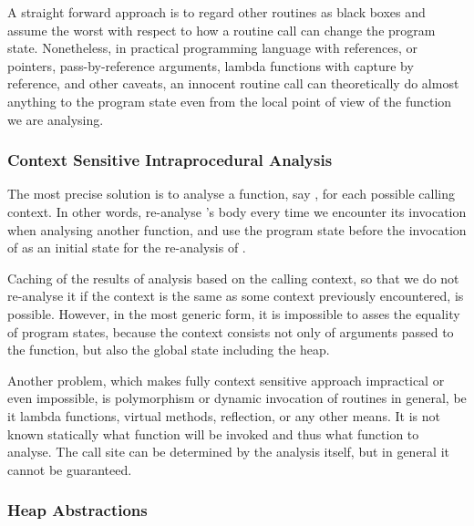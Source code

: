         A straight forward approach is to regard other routines as 
        black boxes and assume the worst with respect to how a 
        routine call can change the program state. Nonetheless, 
        in practical programming language with references, or pointers,  
        pass-by-reference arguments, lambda functions with 
        capture by reference, and other caveats, an innocent 
        routine call can theoretically do almost anything to 
        the program state even from the local point of view 
        of the function we are analysing.
                
        \subsubsection*{Context Sensitive Intraprocedural Analysis}
        
        The most precise solution is to analyse a function, 
        say , for each possible calling context. 
        In other words, re-analyse 's body every 
        time we encounter its invocation when analysing another 
        function, and use the program state before 
        the invocation of  as an initial state 
        for the re-analysis of .
        
        Caching of the results of analysis based on 
        the calling context, so that we do not re-analyse it 
        if the context is the same as some context previously 
        encountered, is possible. However, in the most generic 
        form, it is impossible to asses the equality of 
        program states, because the context consists not only 
        of arguments passed to the function, but also the 
        global state including the heap.
        
        Another problem, which makes fully context sensitive 
        approach impractical or even impossible, is polymorphism 
        or dynamic invocation of routines in general, be it 
        lambda functions, virtual methods, reflection, 
        or any other means. It is not known statically what 
        function will be invoked and thus what function to analyse. 
        The call site can be determined by the analysis itself, 
        but in general it cannot be guaranteed.
        
        \subsubsection*{Heap Abstractions}
        
